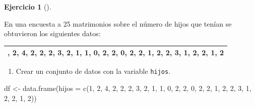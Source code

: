 \documentclass[
  a4paper,
]{scrreport}
\newenvironment{Shaded}{\begin{snugshade}}{\end{snugshade}}
\newcommand{\AttributeTok}[1]{\textcolor[rgb]{0.40,0.45,0.13}{#1}}
\newcommand{\DecValTok}[1]{\textcolor[rgb]{0.68,0.00,0.00}{#1}}
\newcommand{\FunctionTok}[1]{\textcolor[rgb]{0.28,0.35,0.67}{#1}}
\newcommand{\NormalTok}[1]{\textcolor[rgb]{0.00,0.23,0.31}{#1}}
\newcommand{\OtherTok}[1]{\textcolor[rgb]{0.00,0.23,0.31}{#1}}
\providecommand{\tightlist}{%
  \setlength{\itemsep}{0pt}\setlength{\parskip}{0pt}}\usepackage{longtable,booktabs,array}
\theoremstyle{definition}
\newtheorem{exercise}{Ejercicio}[chapter]
\theoremstyle{remark}
\begin{document}
\leavevmode{}%
\begin{exercise}[]\label{exr-1}

En una encuesta a 25 matrimonios sobre el número de hijos que tenían se
obtuvieron los siguientes datos:

\begin{longtable}[]{@{}
  >{\centering\arraybackslash}p{}@{}}
\toprule()
\endhead
1, 2, 4, 2, 2, 2, 3, 2, 1, 1, 0, 2, 2, 0, 2, 2, 1, 2, 2, 3, 1, 2, 2, 1,
2 \\
\bottomrule()
\end{longtable}

\begin{enumerate}
\def\labelenumi{\alph{enumi}.}
\tightlist
\item
  Crear un conjunto de datos con la variable \texttt{hijos}.
\end{enumerate}

\begin{tcolorbox}[enhanced jigsaw, coltitle=black, breakable, bottomtitle=1mm, colbacktitle=quarto-callout-tip-color!10!white, rightrule=.15mm, opacityback=0, opacitybacktitle=0.6, left=2mm, colframe=quarto-callout-tip-color-frame, title=\textcolor{quarto-callout-tip-color}{\faLightbulb}\hspace{0.5em}{Solución}, toprule=.15mm, toptitle=1mm, arc=.35mm, colback=white, titlerule=0mm, bottomrule=.15mm, leftrule=.75mm]

\begin{Shaded}
\begin{Highlighting}[]
\NormalTok{df }\OtherTok{\textless{}{-}} \FunctionTok{data.frame}\NormalTok{(}\AttributeTok{hijos =} \FunctionTok{c}\NormalTok{(}\DecValTok{1}\NormalTok{, }\DecValTok{2}\NormalTok{, }\DecValTok{4}\NormalTok{, }\DecValTok{2}\NormalTok{, }\DecValTok{2}\NormalTok{, }\DecValTok{2}\NormalTok{, }\DecValTok{3}\NormalTok{, }\DecValTok{2}\NormalTok{, }\DecValTok{1}\NormalTok{, }\DecValTok{1}\NormalTok{, }\DecValTok{0}\NormalTok{, }\DecValTok{2}\NormalTok{, }\DecValTok{2}\NormalTok{, }\DecValTok{0}\NormalTok{, }\DecValTok{2}\NormalTok{, }\DecValTok{2}\NormalTok{, }\DecValTok{1}\NormalTok{, }\DecValTok{2}\NormalTok{, }\DecValTok{2}\NormalTok{, }\DecValTok{3}\NormalTok{, }\DecValTok{1}\NormalTok{, }\DecValTok{2}\NormalTok{, }\DecValTok{2}\NormalTok{, }\DecValTok{1}\NormalTok{, }\DecValTok{2}\NormalTok{))}
\end{Highlighting}
\end{Shaded}


\end{tcolorbox}
\end{exercise}
\end{document}
